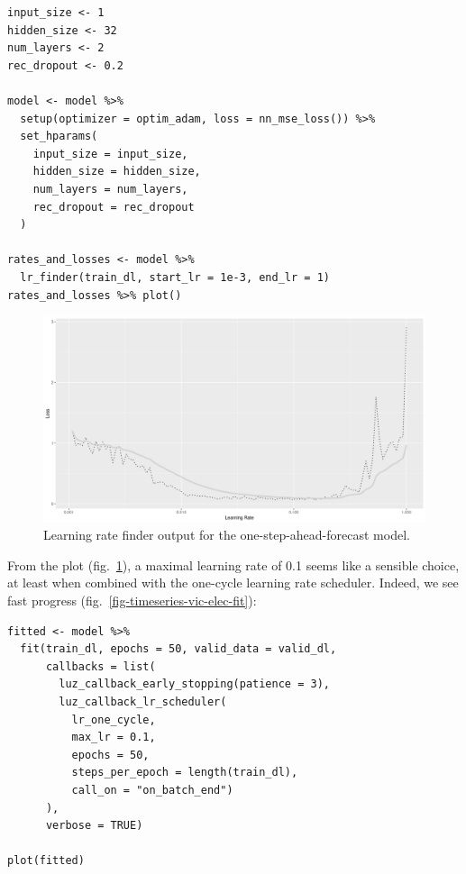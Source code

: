 \documentclass[
  letterpaper,
]{krantz}
\begin{document}
\begin{verbatim}
input_size <- 1
hidden_size <- 32
num_layers <- 2
rec_dropout <- 0.2

model <- model %>%
  setup(optimizer = optim_adam, loss = nn_mse_loss()) %>%
  set_hparams(
    input_size = input_size,
    hidden_size = hidden_size,
    num_layers = num_layers,
    rec_dropout = rec_dropout
  )

rates_and_losses <- model %>% 
  lr_finder(train_dl, start_lr = 1e-3, end_lr = 1)
rates_and_losses %>% plot()
\end{verbatim}

\begin{figure}[H]

{\centering \includegraphics{images/timeseries-vic-elec-lr-finder.png}

}

\caption{\label{fig-timeseries-vic-elec-lr-finder}Learning rate finder
output for the one-step-ahead-forecast model.}

\end{figure}

From the plot (fig.~\ref{fig-timeseries-vic-elec-lr-finder}), a maximal
learning rate of 0.1 seems like a sensible choice, at least when
combined with the one-cycle learning rate scheduler. Indeed, we see fast
progress (fig.~\ref{fig-timeseries-vic-elec-fit}):

\begin{verbatim}
fitted <- model %>%
  fit(train_dl, epochs = 50, valid_data = valid_dl,
      callbacks = list(
        luz_callback_early_stopping(patience = 3),
        luz_callback_lr_scheduler(
          lr_one_cycle,
          max_lr = 0.1,
          epochs = 50,
          steps_per_epoch = length(train_dl),
          call_on = "on_batch_end")
      ),
      verbose = TRUE)

plot(fitted)
\end{verbatim}
\end{document}
